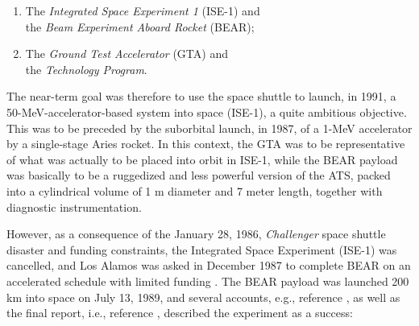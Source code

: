 \documentclass [12pt,a4paper,     ]{report} %
\begin{document}
\begin{enumerate}

\item The \emph{Integrated Space Experiment 1} (ISE-1) and\\ the \emph{Beam Experiment Aboard Rocket} (BEAR);

\item The \emph{Ground Test Accelerator} (GTA) and\\ the \emph{Technology Program}.

\end{enumerate}

The near-term goal was therefore to use the space shuttle to launch, in 1991, a 50-MeV-accelerator-based system into space (ISE-1), a quite ambitious objective.  This was to be preceded by the suborbital launch, in 1987, of a 1-MeV accelerator by a single-stage Aries rocket.  In this context, the GTA was to be representative of what was actually to be placed into orbit in ISE-1, while the BEAR payload was basically to be a ruggedized and less powerful version of the ATS, packed into a cylindrical volume of 1 m diameter and 7 meter length, together with diagnostic instrumentation.

However, as a consequence of the January 28, 1986, \emph{Challenger} space shuttle disaster and funding constraints, the Integrated Space Experiment (ISE-1) was cancelled, and Los Alamos was asked in December 1987 to complete BEAR on an accelerated schedule with limited funding \cite[p.25]{LARHL1989-}.  The BEAR payload was launched 200 km into space on July 13, 1989, and several accounts, e.g., reference \cite{LARHL1989-}, as well as the final report, i.e., reference \cite{NUNZ1990-}, described the experiment as a success:
\end{document}
